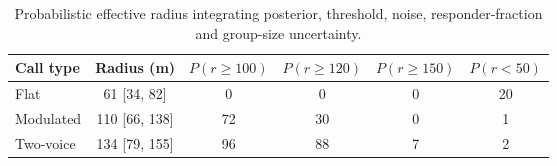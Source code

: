 \begin{table}[!ht]
\centering
\caption{Probabilistic effective radius integrating posterior, threshold, noise, responder-fraction and group-size uncertainty.}
\label{tab:p5risk}
\footnotesize
\begin{tabular}{lccccc}
\toprule
Call type & Radius (m) & $P(r\ge100)$ & $P(r\ge120)$ & $P(r\ge150)$ & $P(r<50)$ \\
\midrule
Flat & 61 [34, 82] & 0 & 0 & 0 & 20 \\
Modulated & 110 [66, 138] & 72 & 30 & 0 & 1 \\
Two-voice & 134 [79, 155] & 96 & 88 & 7 & 2 \\
\bottomrule
\end{tabular}
\end{table}